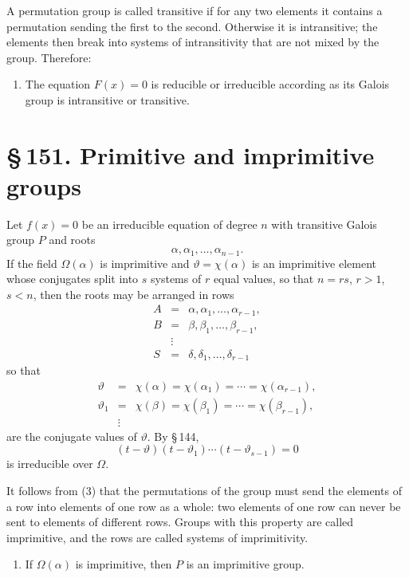 \documentclass[11pt]{article}
\providecommand{\sect}[2]{\section*{\S\,#1. #2}}
\begin{document}
A permutation group is called transitive if for any two elements it contains a permutation sending the first to the second. Otherwise it is intransitive; the elements then break into systems of intransitivity that are not mixed by the group. Therefore:
\begin{enumerate}[label=\arabic*.,leftmargin=2em]
\item The equation $F(x)=0$ is reducible or irreducible according as its Galois group is intransitive or transitive.
\end{enumerate}

\sect{151}{Primitive and imprimitive groups}

Let $f(x)=0$ be an irreducible equation of degree $n$ with transitive Galois group $P$ and roots
\[
        \alpha,
\alpha_1,
\ldots,
\alpha_{n-1}.
\tag{1}
\]
If the field $\Omega(\alpha)$ is imprimitive and $\vartheta=\chi(\alpha)$ is an imprimitive element whose conjugates split into $s$ systems of $r$ equal values, so that $n=rs$, $r>1$, $s<n$, then the roots may be arranged in rows
\[
\begin{array}{lll}
        A&=&\alpha,
\alpha_1,
\ldots,
\alpha_{r-1},\\
        B&=&\beta,
\beta_1,
\ldots,
\beta_{r-1},\\
        &\vdots&\\
        S&=&\delta,
\delta_1,
\ldots,
\delta_{r-1}
\end{array}
\tag{2}
\]
so that
\[
\begin{array}{lll}
        \vartheta&=&\chi(\alpha)=\chi(\alpha_1)=\cdots=\chi(\alpha_{r-1}),\\
        \vartheta_1&=&\chi(\beta)=\chi(\beta_1)=\cdots=\chi(\beta_{r-1}),\\
        &\vdots&
\end{array}
\tag{3}
\]
are the conjugate values of $\vartheta$. By \S\,144,
\[
        (t-\vartheta)(t-\vartheta_1)\cdots(t-\vartheta_{s-1})=0
\tag{4}
\]
is irreducible over $\Omega$.

It follows from (3) that the permutations of the group must send the elements of a row into elements of one row as a whole: two elements of one row can never be sent to elements of different rows. Groups with this property are called imprimitive, and the rows are called systems of imprimitivity.
\begin{enumerate}[label=\arabic*.,leftmargin=2em]
\item If $\Omega(\alpha)$ is imprimitive, then $P$ is an imprimitive group.
\end{enumerate}
\end{document}
